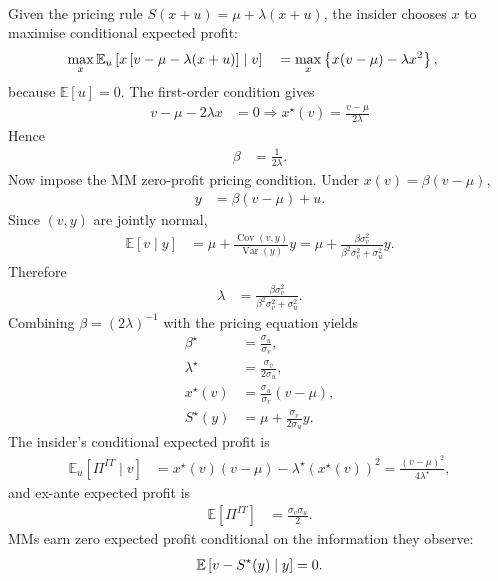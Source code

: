 \documentclass[a4paper,oneside,openany]{book}
\begin{document}
\begin{model}
\par\smallskip\noindent{}\\
Given the pricing rule $S(x+u)=\mu+\lambda(x+u)$, the insider chooses $x$ to maximise conditional expected profit:
\begin{align*}
\max_x\mathbb{E}_u\left[x\left[v-\mu-\lambda(x+u)\right]\mid v\right] \quad
&=\max_x\left\{x(v-\mu)-\lambda x^2\right\},
\end{align*}
because $\mathbb{E}[u]=0$. The first-order condition gives
\begin{align*}
v-\mu-2\lambda x&=0 \Rightarrow x^\star(v)=\frac{v-\mu}{2\lambda}
\end{align*}
Hence
\begin{align*}
\beta&=\frac{1}{2\lambda}.
\end{align*}
Now impose the MM zero-profit pricing condition. Under $x(v)=\beta(v-\mu)$,
\begin{align*}
y&=\beta(v-\mu)+u.
\end{align*}
Since $(v,y)$ are jointly normal,
\begin{align*}
\mathbb{E}[v\mid y]
&=\mu+\frac{\operatorname{Cov}(v,y)}{\operatorname{Var}(y)}y=\mu+\frac{\beta\sigma_v^2}{\beta^2\sigma_v^2+\sigma_u^2}y.
\end{align*}
Therefore
\begin{align*}
\lambda&=\frac{\beta\sigma_v^2}{\beta^2\sigma_v^2+\sigma_u^2}.
\end{align*}
Combining $\beta=(2\lambda)^{-1}$ with the pricing equation yields
\begin{align*}
\beta^\star&=\frac{\sigma_u}{\sigma_v},\\
\lambda^\star&=\frac{\sigma_v}{2\sigma_u},\\
x^\star(v)&=\frac{\sigma_u}{\sigma_v}(v-\mu),\\
S^\star(y)&=\mu+\frac{\sigma_v}{2\sigma_u}y.
\end{align*}
The insider's conditional expected profit is
\begin{align*}
\mathbb{E}_u[\Pi^{IT}\mid v]
&=x^\star(v)(v-\mu)-\lambda^\star (x^\star(v))^2
=\frac{(v-\mu)^2}{4\lambda^\star},
\end{align*}
and ex-ante expected profit is
\begin{align*}
\mathbb{E}[\Pi^{IT}]&=\frac{\sigma_v\sigma_u}{2}.
\end{align*}
MMs earn zero expected profit conditional on the information they observe:
\begin{align*}
\mathbb{E}\left[v-S^\star(y)\mid y\right]=0.
\end{align*}


\end{model}
\end{document}

